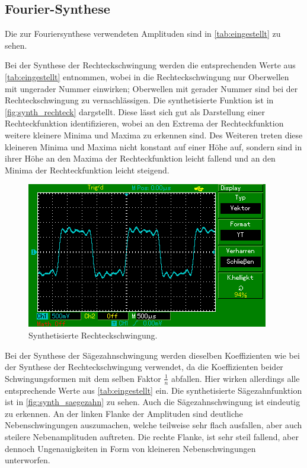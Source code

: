 \subsection{Fourier-Synthese}
Die zur Fouriersynthese verwendeten Amplituden sind in \autoref{tab:eingestellt} zu sehen. 

Bei der Synthese der Rechteckschwingung werden die entsprechenden Werte aus \autoref{tab:eingestellt} entnommen, wobei in die 
Rechteckschwingung nur Oberwellen mit ungerader Nummer einwirken; Oberwellen mit gerader Nummer sind bei der Rechteckschwingung
zu vernachlässigen. Die synthetisierte Funktion ist in \autoref{fig:synth_rechteck} dargstellt. Diese lässt sich gut als 
Darstellung einer Rechteckfunktion identifizieren, wobei an den Extrema der Rechteckfunktion weitere kleinere Minima und Maxima
zu erkennen sind. Des Weiteren treten diese kleineren Minima und Maxima nicht konstant auf einer Höhe auf, sondern sind 
in ihrer Höhe an den Maxima der Rechteckfunktion leicht fallend und an den Minima der Rechteckfunktion leicht steigend. 
\begin{figure} 
  \centering
  \includegraphics{content/MAP002.png}
  \caption{Synthetisierte Rechteckschwingung.}
  \label{fig:synth_rechteck}
\end{figure}

Bei der Synthese der Sägezahnschwingung werden dieselben Koeffizienten wie bei der Synthese der Rechteckschwingung verwendet, da
die Koeffizienten beider Schwingungsformen mit dem selben Faktor $\frac{1}{n}$ abfallen. Hier wirken allerdings alle 
entsprechende Werte aus \autoref{tab:eingestellt} ein. Die synthetisierte Sägezahnfunktion 
ist in \autoref{fig:synth_saegezahn} zu sehen. Auch die Sägezahnschwingung ist eindeutig zu erkennen. An der linken Flanke 
der Amplituden sind deutliche Nebenschwingungen auszumachen, welche teilweise sehr flach ausfallen, aber auch steilere 
Nebenamplituden auftreten. Die rechte Flanke, ist sehr steil fallend, aber dennoch Ungenauigkeiten in Form von kleineren
Nebenschwingungen unterworfen.

